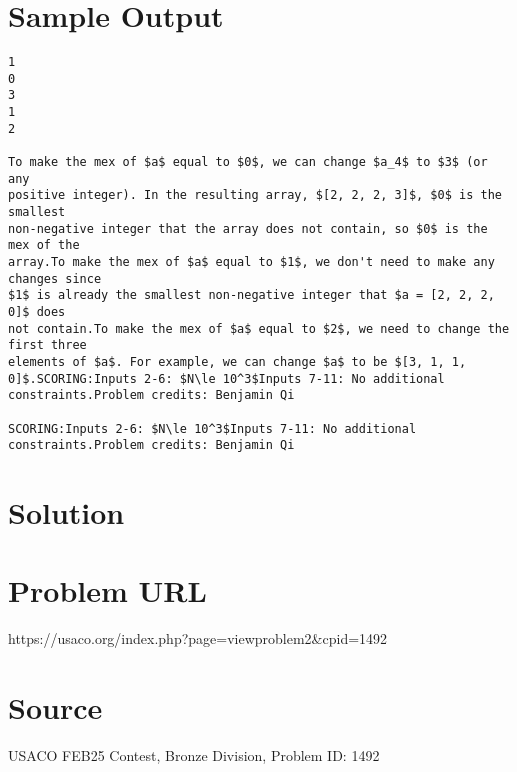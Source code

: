 \documentclass[12pt]{article}
\begin{document}
\section*{Sample Output}
\begin{verbatim}
1
0
3
1
2

To make the mex of $a$ equal to $0$, we can change $a_4$ to $3$ (or any
positive integer). In the resulting array, $[2, 2, 2, 3]$, $0$ is the smallest
non-negative integer that the array does not contain, so $0$ is the mex of the
array.To make the mex of $a$ equal to $1$, we don't need to make any changes since
$1$ is already the smallest non-negative integer that $a = [2, 2, 2, 0]$ does
not contain.To make the mex of $a$ equal to $2$, we need to change the first three
elements of $a$. For example, we can change $a$ to be $[3, 1, 1, 0]$.SCORING:Inputs 2-6: $N\le 10^3$Inputs 7-11: No additional constraints.Problem credits: Benjamin Qi

SCORING:Inputs 2-6: $N\le 10^3$Inputs 7-11: No additional constraints.Problem credits: Benjamin Qi
\end{verbatim}

\section*{Solution}


\section*{Problem URL}
https://usaco.org/index.php?page=viewproblem2&cpid=1492

\section*{Source}
USACO FEB25 Contest, Bronze Division, Problem ID: 1492
\end{document}

